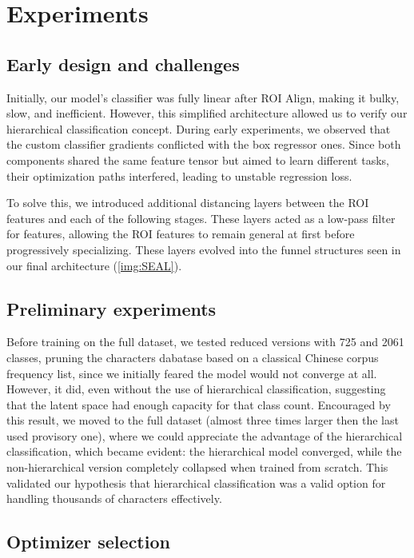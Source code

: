 \section{Experiments}
\label{sec:experiments}

\subsection{Early design and challenges}

Initially, our model’s classifier was fully linear after ROI Align, making it bulky, slow, and inefficient. However, this simplified architecture allowed us to verify our hierarchical classification concept. During early experiments, we observed that the custom classifier gradients conflicted with the box regressor ones. Since both components shared the same feature tensor but aimed to learn different tasks, their optimization paths interfered, leading to unstable regression loss.

To solve this, we introduced additional distancing layers between the ROI features and each of the following stages. These layers acted as a low-pass filter for features, allowing the ROI features to remain general at first before progressively specializing. These layers evolved into the funnel structures seen in our final architecture (\ref{img:SEAL}).

\subsection{Preliminary experiments}

Before training on the full dataset, we tested reduced versions with 725 and 2061 classes, pruning the characters dabatase based on a classical Chinese corpus frequency list, since we initially feared the model would not converge at all. However, it did, even without the use of hierarchical classification, suggesting that the latent space had enough capacity for that class count.
Encouraged by this result, we moved to the full dataset (almost three times larger then the last used provisory one), where we could appreciate the advantage of the hierarchical classification, which became evident: the hierarchical model converged, while the non-hierarchical version completely collapsed when trained from scratch.
This validated our hypothesis that hierarchical classification was a valid option for handling thousands of characters effectively.

\subsection{Optimizer selection}

